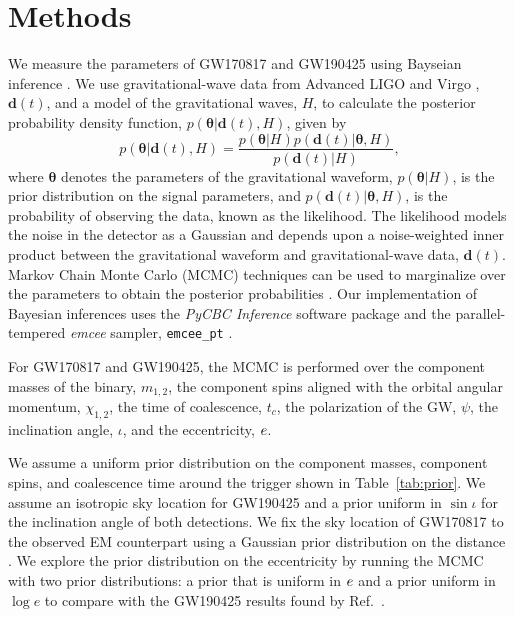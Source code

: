 \section{Methods}

\label{sec:pe-method}

We measure the parameters of GW170817 and GW190425 using Bayseian inference \cite{Finn:2000hj,Rover:2006ni}. We use gravitational-wave data from Advanced LIGO and Virgo \cite{Blackburn:170817,dataLIGO:190425}, $\boldsymbol{d}(t)$, and a model of the gravitational waves, $H$, to calculate the posterior probability density function, $p(\boldsymbol{\theta}|\boldsymbol{d}(t),H)$, given by
\begin{equation}
    p(\boldsymbol{\theta}|\boldsymbol{d}(t),H) = \frac{p(\boldsymbol{\theta}|H) p(\boldsymbol{d}(t)|\boldsymbol{\theta},H)}{p(\boldsymbol{d}(t)|H)},
\end{equation}
where $\boldsymbol{\theta}$ denotes the parameters of the gravitational waveform, $p(\boldsymbol{\theta}|H)$, is the prior distribution on the signal parameters, and $p(\boldsymbol{d}(t)|\boldsymbol{\theta},H)$, is the probability of observing the data, known as the likelihood. The likelihood models the noise in the detector as a Gaussian and depends upon a noise-weighted inner product between the gravitational waveform and gravitational-wave data, $\boldsymbol{d}(t)$. Markov Chain Monte Carlo (MCMC) techniques can be used to marginalize over the parameters to obtain the posterior probabilities \cite{Christensen:2001cr}. Our implementation of Bayesian inferences uses the \textit{PyCBC Inference} software package \cite{Biwer:2018osg,alex_nitz_2020_3630601} and the parallel-tempered \textit{emcee} sampler, \texttt{emcee\_pt} \cite{ForemanMackey:2012ig,emceept}.

For GW170817 and GW190425, the MCMC is performed over the component masses of the binary, $m_{1,2}$, the component spins aligned with the orbital angular momentum, $\chi_{1,2}$, the time of coalescence, $t_c$, the polarization of the GW, $\psi$, the inclination angle, $\iota$, and the eccentricity, $e$.

We assume a uniform prior distribution on the component masses, component spins, and coalescence time around the trigger shown in Table~\ref{tab:prior}. We assume an isotropic sky location for GW190425 and a prior uniform in $\sin \iota$ for the inclination angle of both detections. We fix the sky location of GW170817 to the observed EM counterpart using a Gaussian prior distribution on the distance \cite{Cantiello:2018ffy}. We explore the prior distribution on the eccentricity by running the MCMC with two prior distributions: a prior that is uniform in $e$ and a prior uniform in $\log e$ to compare with the GW190425 results found by Ref.~\cite{Romero-Shaw:2020aaj}.

